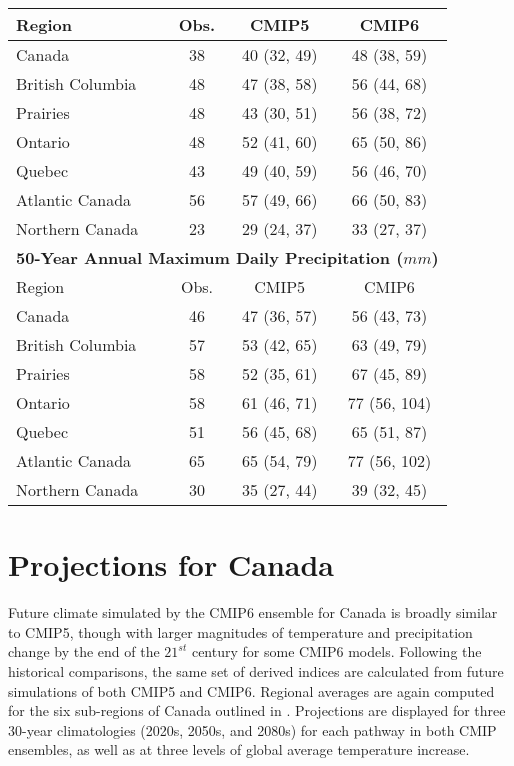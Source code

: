 \documentclass[]{scrartcl}
\begin{document}
\begin{table}[t]
\begin{center}
\begin{tabular}{|l|ccc|}
			\hline
			Region & Obs. & CMIP5 & CMIP6   \\
			\hline
			Canada & 38 & 40 (32, 49) & 48 (38, 59) \\ 
			British Columbia & 48 & 47 (38, 58) & 56 (44, 68) \\ 
			Prairies & 48 & 43 (30, 51) & 56 (38, 72) \\ 
			Ontario & 48 & 52 (41, 60) & 65 (50, 86) \\ 
			Quebec & 43 & 49 (40, 59) & 56 (46, 70) \\ 
			Atlantic Canada & 56 & 57 (49, 66) & 66 (50, 83) \\ 
			Northern Canada & 23 & 29 (24, 37) & 33 (27, 37) \\ 
			\hline	
			\multicolumn{4}{|c|}{\textbf{50-Year Annual Maximum Daily Precipitation ($mm$)}} \\
			\hline
			Region & Obs. & CMIP5 & CMIP6   \\
			\hline
			Canada & 46 & 47 (36, 57) & 56 (43, 73) \\ 
			British Columbia & 57 & 53 (42, 65) & 63 (49, 79) \\ 
			Prairies & 58 & 52 (35, 61) & 67 (45, 89) \\ 
			Ontario & 58 & 61 (46, 71) & 77 (56, 104) \\ 
			Quebec & 51 & 56 (45, 68) & 65 (51, 87) \\ 
			Atlantic Canada & 65 & 65 (54, 79) & 77 (56, 102) \\ 
			Northern Canada & 30 & 35 (27, 44) & 39 (32, 45) \\ 
			\hline	
		\end{tabular}
	\end{center}
\end{table}


\clearpage

\section{Projections for Canada}

Future climate simulated by the CMIP6 ensemble for Canada is broadly similar to CMIP5, though with larger magnitudes of temperature and precipitation change by the end of the $21^{st}$ century for some CMIP6 models. Following the historical comparisons, the same set of derived indices are calculated from future simulations of both CMIP5 and CMIP6. Regional averages are again computed for the six sub-regions of Canada outlined in \cite{zhang_change_2019}. Projections are displayed for three 30-year climatologies (2020s, 2050s, and 2080s) for each pathway in both CMIP ensembles, as well as at three levels of global average temperature increase. 
\end{document}
